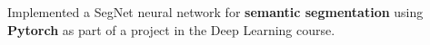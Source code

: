 \item{Implemented a SegNet neural network for \textbf{semantic segmentation} using \textbf{Pytorch} as part of a project in the Deep Learning course.}


